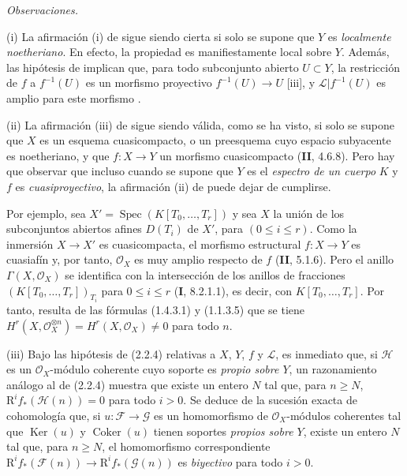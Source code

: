 \begin{env}[2.2.5]
\label{III.2.2.5}
\label{III.2.2.5-fr}
\emph{Observaciones.}

(i) La afirmación (i) de  sigue siendo cierta si solo se supone que $Y$ es \emph{localmente noetheriano}.
En efecto, la propiedad es manifiestamente local sobre $Y$.
Además, las hipótesis de  implican que, para todo subconjunto abierto $U\subset Y$, la restricción de $f$ a $f^{-1}(U)$ es un morfismo proyectivo
$f^{-1}(U)\to U$
[iii], y $\mathcal L|f^{-1}(U)$ es amplio para este morfismo .

(ii) La afirmación (iii) de  sigue siendo válida, como se ha visto, si solo se supone que $X$ es un esquema cuasicompacto, o un preesquema cuyo espacio subyacente es noetheriano, y que $f:X\to Y$ un morfismo cuasicompacto (\textbf{II}, 4.6.8). Pero hay que observar que incluso cuando se supone que $Y$ es el \emph{espectro de un cuerpo} $K$ y $f$ es \emph{cuasiproyectivo}, la afirmación (ii) de  puede dejar de cumplirse.

Por ejemplo, sea
$X'=\operatorname{Spec}(K[T_0,\ldots,T_r])$
y sea $X$ la unión de los subconjuntos abiertos afines $D(T_i)$ de $X'$, para $(0\leq i\leq r)$.
Como la inmersión $X\to X'$ es cuasicompacta, el morfismo estructural $f:X\to Y$ es cuasiafín  y, por tanto, $\mathcal O_X$ es muy amplio respecto de $f$ (\textbf{II}, 5.1.6). Pero el anillo
$\Gamma(X,\mathcal O_X)$ se identifica con la intersección de los anillos de
fracciones $(K[T_0,\ldots,T_r])_{T_i}$ para $0\leq i\leq r$
(\textbf{I}, 8.2.1.1), es decir, con $K[T_0,\ldots,T_r]$. Por tanto, resulta
de las fórmulas (1.4.3.1) y (1.1.3.5) que se tiene
$H^r(X,\mathcal O_X^{\otimes n})=H^r(X,\mathcal O_X)\neq0$
para todo $n$.

(iii) Bajo las hipótesis de (2.2.4) relativas a $X$, $Y$, $f$ y $\mathcal L$, es inmediato que, si $\mathcal H$ es un $\mathcal O_X$-módulo coherente cuyo soporte es \emph{propio sobre $Y$}, un razonamiento análogo al de (2.2.4) muestra que existe un entero $N$ tal que, para $n\geq N$,
$\mathrm R^if_*(\mathcal H(n))=0$
para todo $i>0$. Se deduce de la sucesión exacta de cohomología que, si $u:\mathcal F\to\mathcal G$ es un homomorfismo de $\mathcal O_X$-módulos coherentes tal que $\operatorname{Ker}(u)$ y $\operatorname{Coker}(u)$ tienen soportes \emph{propios sobre $Y$}, existe un entero $N$ tal que, para $n\geq N$, el homomorfismo correspondiente
$\mathrm R^if_*(\mathcal F(n))\to\mathrm R^if_*(\mathcal G(n))$
es \emph{biyectivo} para todo $i>0$.
\end{env}


